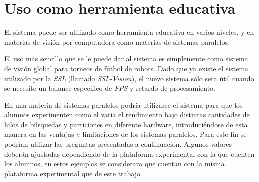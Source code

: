 
\section{Uso como herramienta educativa}

\label{usoEducativo}

El sistema puede ser utilizado como herramienta educativa en varios niveles, y
en materias de visión por computadora como materias de sistemas paralelos.

El uso más sencillo que se le puede dar al sistema es simplemente como sistema
de visión global para torneos de fútbol de robots. Dado que ya existe el sistema
utilizado por la \emph{SSL} (llamado \emph{SSL-Vision}), el nuevo sistema sólo
sera útil cuando se necesite un balance especifico de \emph{FPS} y retardo de
procesamiento.

En una materia de sistemas paralelos podría utilizarse el sistema para que los
alumnos experimenten como el varia el rendimiento bajo distintas cantidades de
hilos de búsquedas y particiones en diferente hardware, introduciéndose de esta
manera en las ventajas y limitaciones de los sistemas paralelos. Para este fin
se podrían utilizar las preguntas presentadas a continuación. Algunos valores
deberán ajustadas dependiendo de la plataforma experimental con la que cuenten
los alumnos, en estos ejemplos se considerara que cuentan con la misma
plataforma experimental que de este trabajo.

